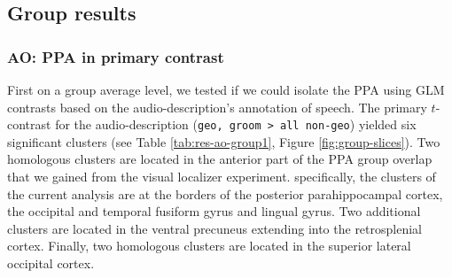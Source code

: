 \documentclass[english]{article}
\begin{document}
\subsection{Group results}





\subsubsection{AO: PPA in primary contrast}

First on a group average level, we tested if we could isolate the PPA using GLM
contrasts based on the audio-description's annotation of speech.
The primary $t$-contrast for the audio-description (\texttt{geo, groom > all
non-geo}) yielded six significant clusters (see Table \ref{tab:res-ao-group1},
Figure \ref{fig:group-slices}).
Two homologous clusters are located in the anterior part of the PPA group
overlap that we gained from the visual localizer experiment.
specifically, the clusters of the current analysis are at the borders of the
posterior parahippocampal cortex, the occipital and temporal fusiform gyrus and
lingual gyrus.
Two additional clusters are located in the ventral precuneus extending into the
retrosplenial cortex.
Finally, two homologous clusters are located in the superior lateral occipital
cortex.
\end{document}
